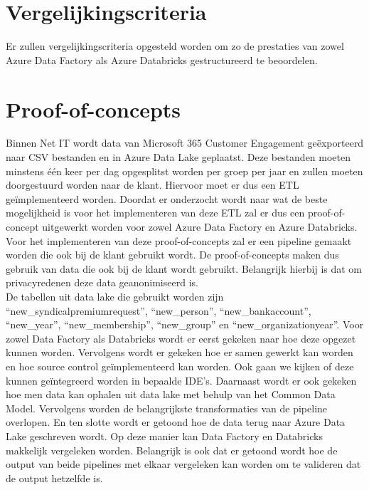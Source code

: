\section{Vergelijkingscriteria}

Er zullen vergelijkingscriteria opgesteld worden om zo de prestaties van zowel Azure Data Factory als Azure Databricks gestructureerd te beoordelen. 

\section{Proof-of-concepts}

Binnen Net IT wordt data van Microsoft 365 Customer Engagement geëxporteerd naar CSV bestanden en in Azure Data Lake geplaatst. Deze bestanden moeten minstens één keer per dag opgesplitst worden per groep per jaar en zullen moeten doorgestuurd worden naar de klant. Hiervoor moet er dus een ETL geïmplementeerd worden. Doordat er onderzocht wordt naar wat de beste mogelijkheid is voor het implementeren van deze ETL zal er dus een proof-of-concept uitgewerkt worden voor zowel Azure Data Factory en Azure Databricks. Voor het implementeren van deze proof-of-concepts zal er een pipeline gemaakt worden die ook bij de klant gebruikt wordt. De proof-of-concepts maken dus gebruik van data die ook bij de klant wordt gebruikt. Belangrijk hierbij is dat om privacyredenen deze data geanonimiseerd is. \\
    

De tabellen uit data lake die gebruikt worden zijn ``new\_syndicalpremiumrequest'', ``new\_person'', ``new\_bankaccount'', ``new\_year'', ``new\_membership'', ``new\_group'' en ``new\_organizationyear''. Voor zowel Data Factory als Databricks wordt er eerst gekeken naar hoe deze opgezet kunnen worden. Vervolgens wordt er gekeken hoe er samen gewerkt kan worden en hoe source control geïmplementeerd kan worden. Ook gaan we kijken of deze kunnen geïntegreerd worden in bepaalde IDE's. Daarnaast wordt er ook gekeken hoe men data kan ophalen uit data lake met behulp van het Common Data Model. Vervolgens worden de belangrijkste transformaties van de pipeline overlopen. En ten slotte wordt er getoond hoe de data terug naar Azure Data Lake geschreven wordt. Op deze manier kan Data Factory en Databricks makkelijk vergeleken worden. Belangrijk is ook dat er getoond wordt hoe de output van beide pipelines met elkaar vergeleken kan worden om te valideren dat de output hetzelfde is.\\
    

